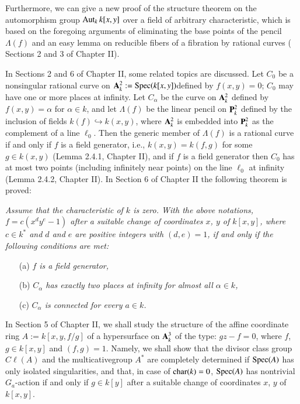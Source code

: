 Furthermore, we can give a new proof of the structure theorem on the
automorphism group $\operatorname{Aut}_{k}k[x,y]$ over a field of arbitrary
characteristic, which is based on the foregoing arguments of
eliminating the base points of the pencil $\Lambda(f)$ and an easy
lemma on reducible fibers of a fibration by rational curves (\cf
Sections 2 and 3 of Chapter II).

In Sections 2 and 6 of Chapter II, some related topics are
discussed. Let $C_{0}$ be a nonsingular rational curve on
$\mathbf{A}^{2}_{k}:=\operatorname{Spec}(k[x,y])$\pageoriginale defined by $f(x,y)=0$;
$C_{0}$ may have 
one or more places at infinity. Let $C_{\alpha}$ be the curve on
$\mathbf{A}^{2}_{k}$ defined by $f(x,y)=\alpha$ for $\alpha\in k$, and let
$\Lambda(f)$ be the linear pencil on $\mathbf{P}^{2}_{k}$ defined by the
inclusion of fields $k(f)\hookrightarrow k(x,y)$, where $\mathbf{A}^{2}_{k}$
is embedded into $\mathbf{P}^{2}_{k}$ as the complement of a line
$\ell_{0}$. Then the generic member of $\Lambda(f)$ is a rational
curve if and only if $f$ is a field generator, i.e., $k(x,y)=k(f,g)$
for some $g\in k(x,y)$ (\cf Lemma 2.4.1, Chapter II), and if $f$ is a
field generator then $C_{0}$ has at most two points (including
infinitely near points) on the line $\ell_{0}$ at infinity (\cf Lemma
2.4.2, Chapter II). In Section 6 of Chapter II the following theorem
is proved:

\newpage

{\em Assume that the characteristic of $k$ is zero. With the above
  notations, $f=c(x^{d}y^{e}-1)$ after a suitable change of
  coordinates $x$, $y$ of $k[x,y]$, where $c\in k^{\ast}$ and $d$ and
  $e$ are positive integers with $(d,e)=1$, if and only if the
  following conditions are met:}
\begin{itemize}
\item[(a)] {\em $f$  is a field generator,}

\item[(b)] {\em $C_{\alpha}$ has exactly two places at infinity for
  almost all $\alpha\in k$,}

\item[(c)] {\em $C_{\alpha}$ is connected for every $a\in k$.}
\end{itemize}

In Section 5 of Chapter II, we shall study the structure of the affine
coordinate ring $A:=k[x,y,f/g]$ of a hypersurface on $\mathbf{A}^{3}_{k}$ of
the type: $gz-f=0$, where $f$, $g\in k[x,y]$ and $(f,g)=1$. Namely, we
shall show that the divisor class group $C\ell(A)$ and the
multicative\pageoriginale group $A^{\ast}$ are completely determined
if $\operatorname{Spec}(A)$ has only isolated singularities, and that, in case of
$\operatorname{char}(k)=0$, $\operatorname{Spec}(A)$ has nontrivial $G_{a}$-action if and only if
$g\in k[y]$ after a suitable change of coordinates $x$, $y$ of
$k[x,y]$.


